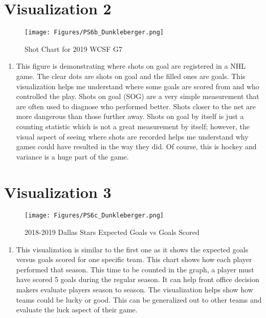 \documentclass{article}
\begin{document}
\section{Visualization 2}

\begin{figure}[h]
    \centering
    \texttt{[image: Figures/PS6b\_Dunkleberger.png]}
    \caption{Shot Chart for 2019 WCSF G7}
    \label{fig:Shot Chart for 2019 WCSF Game 7}
\end{figure}

\begin{enumerate}
    \item This figure is demonstrating where shots on goal are registered in a NHL game. The clear dots are shots on goal and the filled ones are goals. This visualization helps me understand where some goals are scored from and who controlled the play. Shots on goal (SOG) are a very simple measurement that are often used to diagnose who performed better. Shots closer to the net are more dangerous than those further away. Shots on goal by itself is just a counting statistic which is not a great measurement by itself; however, the visual aspect of seeing where shots are recorded helps me understand why games could have resulted in the way they did. Of course, this is hockey and variance is a huge part of the game. 
\end{enumerate}

\section{Visualization 3}

\begin{figure}[h]
    \centering
    \texttt{[image: Figures/PS6c\_Dunkleberger.png]}
    \caption{2018-2019 Dallas Stars Expected Goals vs Goals Scored}
    \label{fig:2018-2019 Dallas Stars EG vs GS}
\end{figure}

\begin{enumerate}
    \item This visualization is similar to the first one as it shows the expected goals versus goals scored for one specific team. This chart shows how each player performed that season. This time to be counted in the graph, a player must have scored 5 goals during the regular season. It can help front office decision makers evaluate players season to season. The visualization helps show how teams could be lucky or good. This can be generalized out to other teams and evaluate the luck aspect of their game.
\end{enumerate}
\end{document}

